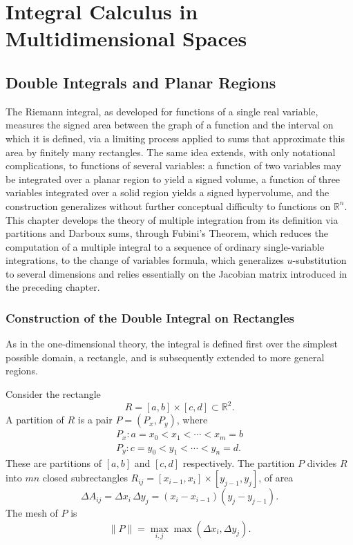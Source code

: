 \chapter{Integral Calculus in Multidimensional Spaces}

\section{Double Integrals and Planar Regions}
\label{sec:double-integrals}

The Riemann integral, as developed for functions of a single real variable, measures the signed area between the graph of a function and the interval on which it is defined, via a limiting process applied to sums that approximate this area by finitely many rectangles. The same idea extends, with only notational complications, to functions of several variables: a function of two variables may be integrated over a planar region to yield a signed volume, a function of three variables integrated over a solid region yields a signed hypervolume, and the construction generalizes without further conceptual difficulty to functions on $\mathbb{R}^n$. This chapter develops the theory of multiple integration from its definition via partitions and Darboux sums, through Fubini's Theorem, which reduces the computation of a multiple integral to a sequence of ordinary single-variable integrations, to the change of variables formula, which generalizes $u$-substitution to several dimensions and relies essentially on the Jacobian matrix introduced in the preceding chapter.

\subsection{Construction of the Double Integral on Rectangles}

As in the one-dimensional theory, the integral is defined first over the simplest possible domain, a rectangle, and is subsequently extended to more general regions.

\begin{definition}
Consider the rectangle
\[
R = [a,b]\times[c,d] \subset \mathbb{R}^2.
\]
A partition of $R$ is a pair $P = (P_x, P_y)$, where
\[
\begin{gathered}
P_x : a = x_0 < x_1 < \cdots < x_m = b \\
P_y : c = y_0 < y_1 < \cdots < y_n = d.
\end{gathered}
\]
These are partitions of $[a,b]$ and $[c,d]$ respectively. The partition $P$ divides $R$ into $mn$ closed subrectangles $R_{ij} = [x_{i-1},x_i]\times[y_{j-1},y_j]$, of area
\[
\Delta A_{ij} = \Delta x_i \, \Delta y_j = (x_i - x_{i-1})(y_j-y_{j-1}).
\]
The mesh of $P$ is
\[
\|P\| = \max_{i,j} \max(\Delta x_i, \Delta y_j).
\]

\end{definition}

